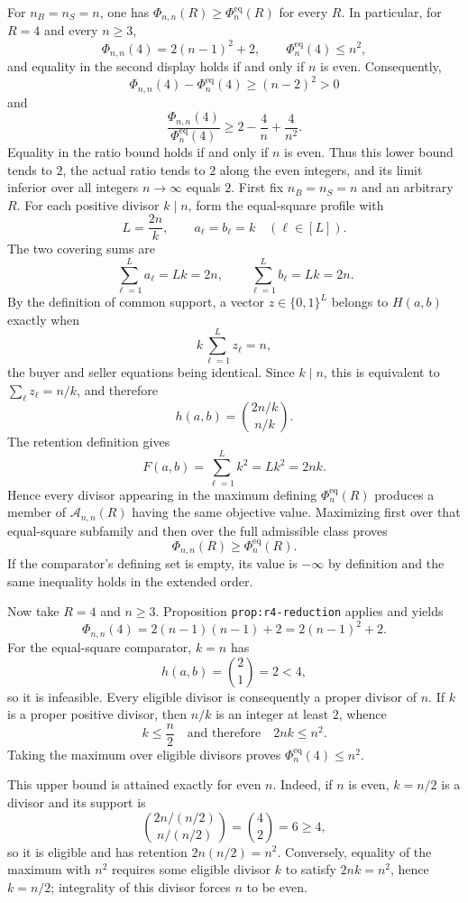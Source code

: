 For \(n_B=n_S=n\), one has \(\Phi_{n,n}(R)\ge \Phi_n^{\mathrm{eq}}(R)\) for every \(R\). In particular, for \(R=4\) and every \(n\ge3\),
\[
\Phi_{n,n}(4)=2(n-1)^2+2,
\qquad
\Phi_n^{\mathrm{eq}}(4)\le n^2,
\]
and equality in the second display holds if and only if \(n\) is even. Consequently,
\[
\Phi_{n,n}(4)-\Phi_n^{\mathrm{eq}}(4)\ge (n-2)^2>0
\]
and
\[
\frac{\Phi_{n,n}(4)}{\Phi_n^{\mathrm{eq}}(4)}
\ge 2-\frac4n+\frac4{n^2}.
\]
Equality in the ratio bound holds if and only if \(n\) is even. Thus this lower bound tends to \(2\), the actual ratio tends to \(2\) along the even integers, and its limit inferior over all integers \(n\to\infty\) equals \(2\).
First fix \(n_B=n_S=n\) and an arbitrary \(R\). For each positive divisor \(k\mid n\), form the equal-square profile with
\[
L=\frac{2n}{k},\qquad a_\ell=b_\ell=k\quad(\ell\in[L]).
\]
The two covering sums are
\[
\sum_{\ell=1}^{L}a_\ell=Lk=2n,
\qquad
\sum_{\ell=1}^{L}b_\ell=Lk=2n.
\]
By the definition of common support, a vector \(z\in\{0,1\}^{L}\) belongs to \(H(a,b)\) exactly when
\[
k\sum_{\ell=1}^{L}z_\ell=n,
\]
the buyer and seller equations being identical. Since \(k\mid n\), this is equivalent to \(\sum_\ell z_\ell=n/k\), and therefore
\[
h(a,b)=\binom{2n/k}{n/k}.
\]
The retention definition gives
\[
F(a,b)=\sum_{\ell=1}^{L}k^2=Lk^2=2nk.
\]
Hence every divisor appearing in the maximum defining \(\Phi_n^{\mathrm{eq}}(R)\) produces a member of \(\mathcal A_{n,n}(R)\) having the same objective value. Maximizing first over that equal-square subfamily and then over the full admissible class proves
\[
\Phi_{n,n}(R)\ge \Phi_n^{\mathrm{eq}}(R).
\]
If the comparator's defining set is empty, its value is \(-\infty\) by definition and the same inequality holds in the extended order.

Now take \(R=4\) and \(n\ge3\). Proposition \texttt{prop:r4-reduction} applies and yields
\[
\Phi_{n,n}(4)=2(n-1)(n-1)+2=2(n-1)^2+2.
\]
For the equal-square comparator, \(k=n\) has
\[
h(a,b)=\binom21=2<4,
\]
so it is infeasible. Every eligible divisor is consequently a proper divisor of \(n\). If \(k\) is a proper positive divisor, then \(n/k\) is an integer at least \(2\), whence
\[
k\le \frac n2
\quad\text{and therefore}\quad
2nk\le n^2.
\]
Taking the maximum over eligible divisors proves \(\Phi_n^{\mathrm{eq}}(4)\le n^2\).

This upper bound is attained exactly for even \(n\). Indeed, if \(n\) is even, \(k=n/2\) is a divisor and its support is
\[
\binom{2n/(n/2)}{n/(n/2)}=\binom42=6\ge4,
\]
so it is eligible and has retention \(2n(n/2)=n^2\). Conversely, equality of the maximum with \(n^2\) requires some eligible divisor \(k\) to satisfy \(2nk=n^2\), hence \(k=n/2\); integrality of this divisor forces \(n\) to be even.

